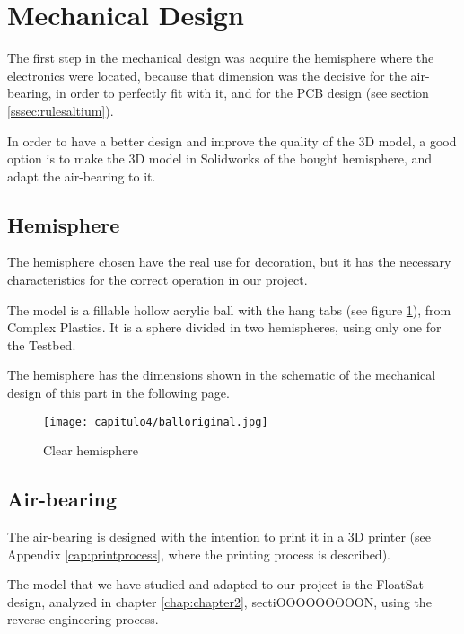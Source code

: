 \section{Mechanical Design} \label{sec:mechanicaldesign}

The first step in the mechanical design was acquire the hemisphere where the electronics were located, because that dimension was the decisive for the air-bearing, in order to perfectly fit with it, and for the PCB design (see section \ref{sssec:rulesaltium}).

In order to have a better design and improve the quality of the 3D model, a good option is to make the 3D model in Solidworks of the bought hemisphere, and adapt the air-bearing to it.

\subsection{Hemisphere} \label{ssec:hemisphere}

The hemisphere chosen have the real use for decoration, but it has the necessary characteristics for the correct operation in our project. 

The model is a fillable hollow acrylic ball with the hang tabs (see figure \ref{fig:hemisphere}), from Complex Plastics. It is a sphere divided in two hemispheres, using only one for the Testbed.

The hemisphere has the dimensions shown in the schematic of the mechanical design of this part in the following page.


\begin{figure}[H]
	\centering
		\texttt{[image: capitulo4/balloriginal.jpg]}
	\caption{Clear hemisphere}
	\label{fig:hemisphere}
\end{figure}




\subsection{Air-bearing} \label{ssec:airbearing}

The air-bearing is designed with the intention to print it in a 3D printer (see Appendix \ref{cap:printprocess}, where the printing process is described). 

The model that we have studied and adapted to our project is the FloatSat design, analyzed in chapter \ref{chap:chapter2}, sectiOOOOOOOOON, using the reverse engineering process.

